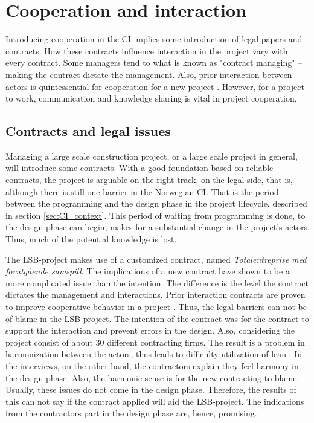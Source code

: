 \section{Cooperation and interaction} \label{sec:cooperation}
Introducing cooperation in the CI implies some introduction of legal papers and contracts. How these contracts influence interaction in the project vary with every contract. Some managers tend to what is known as "contract managing" – making the contract dictate the management. Also, prior interaction between actors is quintessential for cooperation for a new project \citep{rolfsen}. However, for a project to work, communication and knowledge sharing is vital in project cooperation. 

\subsection{Contracts and legal issues}
Managing a large scale construction project, or a large scale project in general, will introduce some contracts. With a good foundation based on reliable contracts, the project is arguable on the right track, on the legal side, that is, although there is still one barrier in the Norwegian CI. That is the period between the programming and the design phase in the project lifecycle, described in section \ref{sec:CI_context}. This period of waiting from programming is done, to the design phase can begin, makes for a substantial change in the project's actors. Thus, much of the potential knowledge is lost. 

The LSB-project makes use of a customized contract, named \textit{Totalentreprise med forutgående samspill}. The implications of a new contract have shown to be a more complicated issue than the intention. The difference is the level the contract dictates the management and interactions. Prior interaction contracts are proven to improve cooperative behavior in a project \citep{wang2017prior}. Thus, the legal barriers can not be of blame in the LSB-project. The intention of the contract was for the contract to support the interaction and prevent errors in the design. Also, considering the project consist of about 30 different contracting firms. The result is a problem in harmonization between the actors, thus leads to difficulty utilization of lean \citep{miller2002harmonization}. In the interviews, on the other hand, the contractors explain they feel harmony in the design phase. Also, the harmonic sense is for the new contracting to blame. Usually, these issues do not come in the design phase. Therefore, the results of this can not say if the contract applied will aid the LSB-project. The indications from the contractors part in the design phase are, hence, promising. 
    
